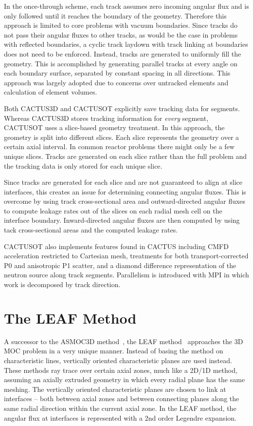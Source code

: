 In the once-through scheme, each track assumes zero incoming angular flux and is only followed until it reaches the boundary of the geometry. Therefore this approach is limited to core problems with vacuum boundaries. Since tracks do not pass their angular fluxes to other tracks, as would be the case in problems with reflected boundaries, a cyclic track laydown with track linking at boundaries does not need to be enforced. Instead, tracks are generated to uniformly fill the geometry. This is accomplished by generating parallel tracks at every angle on each boundary surface, separated by constant spacing in all directions. This approach was largely adopted due to concerns over untracked elements and calculation of element volumes.

Both CACTUS3D and CACTUSOT explicitly save tracking data for segments. Whereas CACTUS3D stores tracking information for \textit{every} segment, CACTUSOT uses a slice-based geometry treatment. In this approach, the geometry is split into different slices. Each slice represents the geometry over a certain axial interval. In common reactor problems there might only be a few unique slices. Tracks are generated on each slice rather than the full problem and the tracking data is only stored for each unique slice. 

Since tracks are generated for each slice and are not guaranteed to align at slice interfaces, this creates an issue for determining connecting angular fluxes. This is overcome by using track cross-sectional area and outward-directed angular fluxes to compute leakage rates out of the slices on each radial mesh cell on the interface boundary. Inward-directed angular fluxes are then computed by using tack cross-sectional areas and the computed leakage rates.

CACTUSOT also implements features found in CACTUS including \ac{CMFD} acceleration restricted to Cartesian mesh, treatments for both transport-corrected P0 and anisotropic P1 scatter, and a diamond difference representation of the neutron source along track segments. Parallelism is introduced with \ac{MPI} in which work is decomposed by track direction.


\section{The LEAF Method}
\label{sec:leaf}

A successor to the ASMOC3D method~\cite{pre_leaf}, the LEAF method~\cite{leaf_init, leaf_method} approaches the 3D \ac{MOC} problem in a very unique manner. Instead of basing the method on characteristic lines, vertically oriented characteristic planes are used instead. These methods ray trace over certain axial zones, much like a 2D/1D method, assuming an axially extruded geometry in which every radial plane has the same meshing. The vertically oriented characteristic planes are chosen to link at interfaces -- both between axial zones and between connecting planes along the same radial direction within the current axial zone. In the LEAF method, the angular flux at interfaces is represented with a 2nd order Legendre expansion.

